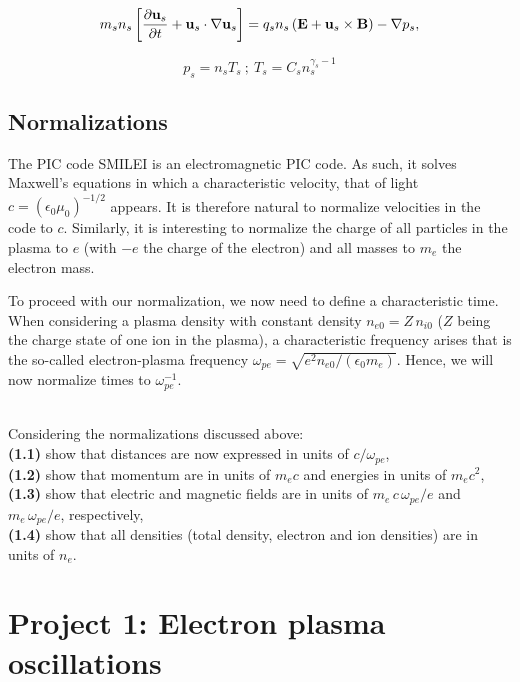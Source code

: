 \documentclass[11pt,a4paper]{article}
\newcommand{\vE}{\mathbf{E}}
\newcommand{\vB}{\mathbf{B}}
\newcommand{\vu}{\mathbf{u}}
\begin{document}
\begin{equation}
m_s n_s \left[\frac{\partial \vu_s}{\partial t}+\vu_s \cdot {\bf{\nabla}} \vu_s
\right] = q_s n_s \left( \vE + \vu_s \times \vB \right) - {\bf{\nabla}} p_s ,  
\end{equation}


\begin{equation}
p_s = n_s T_s ~;~  
T_s = C_s n_s^{\gamma_s-1}
\end{equation}

\subsection*{Normalizations}

The PIC code SMILEI is an electromagnetic PIC code. As such, it solves Maxwell's equations in which a characteristic velocity, that of light $c = (\epsilon_0 \mu_0)^{-1/2}$ appears. It is therefore natural to normalize velocities in the code to $c$. Similarly, it is interesting to normalize the charge of all particles in the plasma to $e$ (with $-e$ the charge of the electron) and all masses to $m_e$ the electron mass.

To proceed with our normalization, we now need to define a characteristic time. When considering a plasma density with constant density $n_{e0} = Z\,n_{i0}$ ($Z$ being the charge state of one ion in the plasma), a characteristic frequency arises that is the so-called electron-plasma frequency $\omega_{pe} = \sqrt{e^2 n_{e0}/(\epsilon_0 m_e)}$. Hence, we will now normalize times to $\omega_{pe}^{-1}$.

\\
Considering the normalizations discussed above: \\
{\bf (1.1)} show that distances are now expressed in units of $c/\omega_{pe}$,\\
{\bf (1.2)} show that momentum are in units of $m_e c$ and energies in units of $m_e c^2$,\\
{\bf (1.3)} show that electric and magnetic fields are in units of $m_e\,c\,\omega_{pe}/e$ and $m_e\,\omega_{pe}/e$, respectively,\\
{\bf (1.4)} show that all densities (total density, electron and ion densities) are in units of $n_e$.

\newpage
\section*{Project 1: Electron plasma oscillations}\label{proj1}
\end{document}
